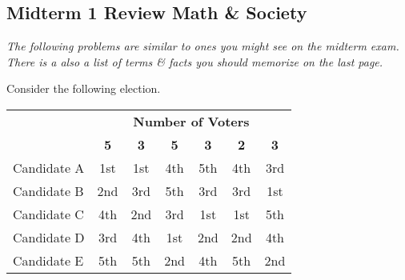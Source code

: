 \documentclass[11pt]{exam}
\begin{document}
\pagestyle{empty}
\graphicspath{{/home/brian/Dropbox/HSC/Spring16/Math111/}}

\subsection*{Midterm 1 Review \hfill Math \& Society}

\textit{The following problems are similar to ones you might see on the midterm exam. There is a also a list of terms \& facts you should memorize on the last page.}

\begin{questions}

\question Consider the following election. 
\begin{center}
\begin{tabular}{lcccccc}
\rowcolor{gray!30} & \multicolumn{6}{c}{\textbf{Number of Voters}} \\
\rowcolor{gray!30}  & \textbf{5} & \textbf{3} & \textbf{5} & \textbf{3} & \textbf{2} & \textbf{3} \\
Candidate A & 1st & 1st & 4th & 5th & 4th & 3rd \\ \hline 
Candidate B & 2nd & 3rd & 5th & 3rd & 3rd & 1st \\ \hline 
Candidate C & 4th & 2nd & 3rd & 1st & 1st & 5th \\ \hline 
Candidate D & 3rd & 4th & 1st & 2nd & 2nd & 4th \\ \hline 
Candidate E & 5th & 5th & 2nd & 4th & 5th & 2nd \\ \hline
\end{tabular}
\end{center}

\end{questions}
\end{document}

